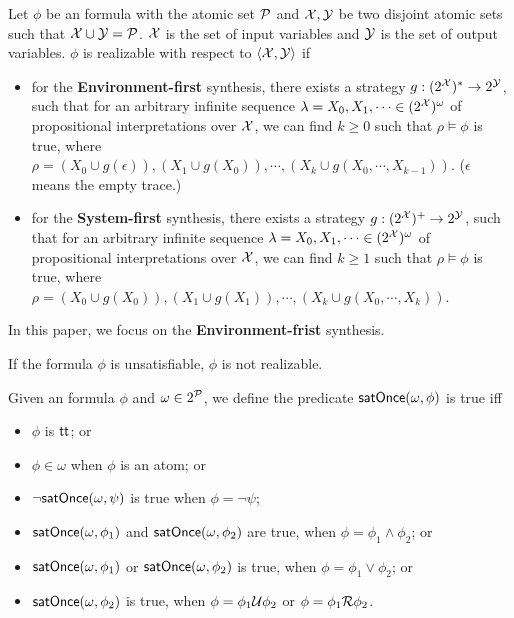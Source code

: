 \begin{definition}\label{def:synthesis}
Let $\phi$ be an \ltlf formula with the atomic set $\P$ and $\X,\Y$ be two disjoint atomic sets such that $\X\cup \Y= \P$. $\X$ is the set of input variables and $\Y$ is the set of output variables. $\phi$ is realizable with respect to $\langle \X,\Y\rangle$ if 
\begin{itemize}
\item for the \textbf{Environment-first} synthesis, there exists a strategy $g: (2^\X)^* \to 2^\Y$, such that for an arbitrary infinite sequence $\lambda = X_0, X_1, \cdots \in (2^\X)^\omega$ of propositional interpretations over $\X$, we can find $k \geq 0$ such that $\rho\models\phi$ is true, where $\rho=(X_0\cup g(\epsilon)),(X_1\cup g(X_0)),\cdots,(X_k\cup g(X_0,\cdots,X_{k-1}))$. ($\epsilon$ means the empty trace.) 
\item for the \textbf{System-first} synthesis, there exists a strategy $g: (2^\X)^+ \to 2^\Y$, such that for an arbitrary infinite sequence $\lambda = X_0, X_1, \cdots \in (2^\X)^\omega$ of propositional interpretations over $\X$, we can find $k \geq 1$ such that $\rho\models\phi$ is true, where $\rho=(X_0\cup g(X_0)),(X_1\cup g(X_1)),\cdots,(X_k\cup g(X_0,\cdots,X_{k}))$. 
\end{itemize}
\end{definition}

In this paper, we focus on the \textbf{Environment-frist} \ltlf synthesis.

\begin{lemma}
	If the \ltlf formula $\phi$ is unsatisfiable, $\phi$ is not realizable. 
\end{lemma}

\begin{definition}\label{def:satOnce}
Given an \ltlf formula $\phi$ and $\omega\in 2^{\P}$, we define the predicate $\satOnce (\omega, \phi)$ is true iff 
\begin{itemize}
	\item $\phi$ is $\tt$; or
	\item $\phi \in \omega$ when $\phi$ is an atom; or 
	\item $\neg \satOnce (\omega, \psi)$ is true when $\phi = \neg\psi$;
	\item $\satOnce (\omega, \phi_1)$ and $\satOnce (\omega, \phi_2)$ are true, when $\phi = \phi_1\wedge\phi_2$; or 
	\item $\satOnce (\omega, \phi_1)$ or $\satOnce (\omega, \phi_2)$ is true, when $\phi = \phi_1\vee\phi_2$; or
	\item $\satOnce (\omega, \phi_2)$ is true, when $\phi = \phi_1\U\phi_2$ or $\phi = \phi_1\R\phi_2$.
\end{itemize} 
\end{definition}

